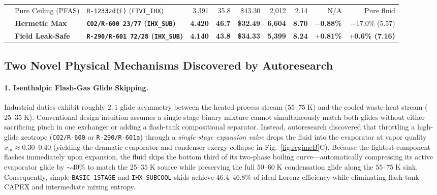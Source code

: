 \documentclass[twocolumn,10pt]{article}
\begin{document}
\begin{table}[t]
\begin{tabular}{@{}lllrrrrrrr@{}}
\midrule
{}
 & Pure Ceiling (PFAS) & \texttt{R-1233zd(E)} (\texttt{FTVI\_IHX}) & 3.391 & 35.8 & \$43.30 & 2{,}012 & 2.14 & N/A & Pure fluid \\
 & \textbf{Hermetic Max} & \textbf{\texttt{CO2/R-600 23/77} (\texttt{IHX\_SUB})} & \textbf{4.420} & \textbf{46.7} & \textbf{\$32.49} & \textbf{6{,}604} & \textbf{8.70} & \textbf{$-$0.88\%} & $-$17.0\% (5.57) \\
 & \textbf{Field Leak-Safe} & \textbf{\texttt{R-290/R-601 72/28} (\texttt{IHX\_SUB})} & \textbf{4.140} & \textbf{43.8} & \textbf{\$34.33} & \textbf{5{,}399} & \textbf{8.24} & \textbf{$+$0.81\%} & \textbf{$+$0.6\% (7.16)} \\
\bottomrule
\end{tabular}
\end{table}

\subsection{Two Novel Physical Mechanisms Discovered by Autoresearch}

\paragraph{1. Isenthalpic Flash-Gas Glide Skipping.}
Industrial duties exhibit roughly $2{:}1$ glide asymmetry between the heated process stream ($55\text{--}75\;\text{K}$) and the cooled waste-heat stream ($25\text{--}35\;\text{K}$). Conventional design intuition assumes a single-stage binary mixture cannot simultaneously match both glides without either sacrificing pinch in one exchanger or adding a flash-tank compositional separator. Instead, autoresearch discovered that throttling a high-glide zeotrope (\texttt{CO2/R-600} or \texttt{R-290/R-601a}) through a \emph{single-stage expansion valve} drops the fluid into the evaporator at vapor quality $x_{\text{in}}\approx 0.30\text{--}0.40$ (yielding the dramatic evaporator and condenser exergy collapse in Fig.~\ref{fig:regimeB}C). Because the lightest component flashes immediately upon expansion, the fluid skips the bottom third of its two-phase boiling curve—automatically compressing its active evaporator glide by $\sim 40\%$ to match the $25\text{--}35\;\text{K}$ source while preserving the full $50\text{--}60\;\text{K}$ condensation glide along the $55\text{--}75\;\text{K}$ sink. Consequently, simple \texttt{BASIC\_1STAGE} and \texttt{IHX\_SUBCOOL} skids achieve $46.4\text{--}46.8\%$ of ideal Lorenz efficiency while eliminating flash-tank CAPEX and intermediate mixing entropy.
\end{document}
